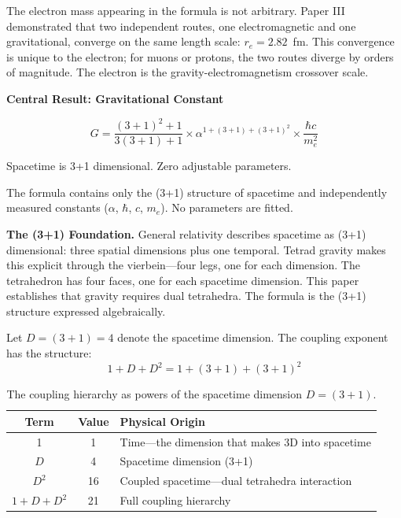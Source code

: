 \documentclass[aps,prd,preprint,superscriptaddress,showpacs,preprintnumbers,amsmath,amssymb,nofootinbib]{revtex4-2}
\begin{document}
The electron mass appearing in the formula is not arbitrary. Paper III demonstrated that two independent routes, one electromagnetic and one gravitational, converge on the same length scale: $r_e = 2.82$~fm. This convergence is unique to the electron; for muons or protons, the two routes diverge by orders of magnitude. The electron is the gravity-electromagnetism crossover scale.

\vspace{1.5em}
\noindent
\colorbox{resultgreen}{\parbox{\dimexpr\textwidth-2\fboxsep\relax}{%
\vspace{0.8em}
\centering
\textbf{\large Central Result: Gravitational Constant}

\vspace{0.5em}
\boldmath
\begin{equation}
G = \frac{(3+1)^2 + 1}{3(3+1) + 1} \times \alpha^{1+(3+1)+(3+1)^2} \times \frac{\hbar c}{m_e^2}
\label{eq:G}
\end{equation}
\unboldmath

\vspace{0.3em}
Spacetime is 3+1 dimensional. Zero adjustable parameters.
\vspace{0.5em}
}}
\vspace{1cm}

The formula contains only the (3+1) structure of spacetime and independently measured constants ($\alpha$, $\hbar$, $c$, $m_e$). No parameters are fitted.

\textbf{The (3+1) Foundation.} General relativity describes spacetime as (3+1) dimensional: three spatial dimensions plus one temporal. Tetrad gravity makes this explicit through the vierbein---four legs, one for each dimension. The tetrahedron has four faces, one for each spacetime dimension. This paper establishes that gravity requires dual tetrahedra. The formula is the (3+1) structure expressed algebraically.

Let $D = (3+1) = 4$ denote the spacetime dimension. The coupling exponent has the structure:
\begin{equation}
1 + D + D^2 = 1 + (3+1) + (3+1)^2
\end{equation}

\begin{table}[H]
\centering
\begin{tabular*}{\textwidth}{@{\extracolsep{\fill}} ccl @{}}
\toprule
\textbf{Term} & \textbf{Value} & \textbf{Physical Origin} \\
\midrule
1 & 1 & Time---the dimension that makes 3D into spacetime \\
$D$ & 4 & Spacetime dimension (3+1) \\
$D^2$ & 16 & Coupled spacetime---dual tetrahedra interaction \\
\midrule
$1 + D + D^2$ & 21 & Full coupling hierarchy \\
\bottomrule
\end{tabular*}
\caption{The coupling hierarchy as powers of the spacetime dimension $D = (3+1)$.}
\label{tab:coupling-hierarchy}
\end{table}
\end{document}
